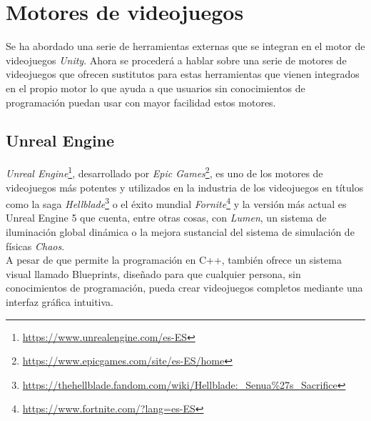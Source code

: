 \section{Motores de videojuegos}

Se ha abordado una serie de herramientas externas que se integran en el motor de videojuegos \textit{Unity}. Ahora se procederá a hablar sobre una serie de motores de videojuegos que ofrecen sustitutos para estas herramientas que vienen integrados en el propio motor lo que ayuda a que usuarios sin conocimientos de programación puedan usar con mayor facilidad estos motores.

\subsection{Unreal Engine}
\textit{Unreal Engine}\footnote{\url{https://www.unrealengine.com/es-ES}}, desarrollado por \textit{Epic Games}\footnote{\url{https://www.epicgames.com/site/es-ES/home}}, es uno de los motores de videojuegos más potentes y utilizados en la industria de los videojuegos en títulos como la saga \textit{Hellblade}\footnote{\url{https://thehellblade.fandom.com/wiki/Hellblade:_Senua\%27s_Sacrifice}} o el éxito mundial \textit{Fornite}\footnote{\url{https://www.fortnite.com/?lang=es-ES}} y la versión más actual es Unreal Engine 5 que cuenta, entre otras cosas, con \textit{Lumen}, un sistema de iluminación global dinámica o la mejora sustancial del sistema de simulación de físicas \textit{Chaos}.\\
A pesar de que permite la programación en C++, también ofrece un sistema visual llamado Blueprints, diseñado para que cualquier persona, sin conocimientos de programación, pueda crear videojuegos completos mediante una interfaz gráfica intuitiva.

